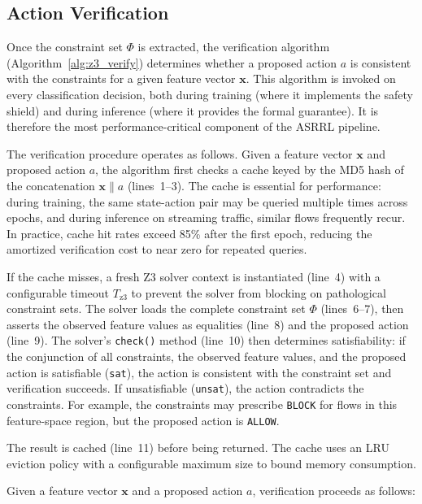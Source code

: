 \documentclass[12pt, letterpaper, oneside]{report}
\newcommand{\ASRRL}{\textsc{ASRRL}}
\newcommand{\bx}{\mathbf{x}}
\begin{document}
\subsection{Action Verification}
\label{sec:z3_verify}

Once the constraint set $\Phi$ is extracted, the verification algorithm (Algorithm~\ref{alg:z3_verify}) determines whether a proposed action $a$ is consistent with the constraints for a given feature vector $\bx$. This algorithm is invoked on every classification decision, both during training (where it implements the safety shield) and during inference (where it provides the formal guarantee). It is therefore the most performance-critical component of the \ASRRL{} pipeline.

The verification procedure operates as follows. Given a feature vector $\bx$ and proposed action $a$, the algorithm first checks a cache keyed by the MD5 hash of the concatenation $\bx \| a$ (lines~1--3). The cache is essential for performance: during training, the same state-action pair may be queried multiple times across epochs, and during inference on streaming traffic, similar flows frequently recur. In practice, cache hit rates exceed 85\% after the first epoch, reducing the amortized verification cost to near zero for repeated queries.

If the cache misses, a fresh Z3 solver context is instantiated (line~4) with a configurable timeout $T_{\text{z3}}$ to prevent the solver from blocking on pathological constraint sets. The solver loads the complete constraint set $\Phi$ (lines~6--7), then asserts the observed feature values as equalities (line~8) and the proposed action (line~9). The solver's \texttt{check()} method (line~10) then determines satisfiability: if the conjunction of all constraints, the observed feature values, and the proposed action is satisfiable (\texttt{sat}), the action is consistent with the constraint set and verification succeeds. If unsatisfiable (\texttt{unsat}), the action contradicts the constraints. For example, the constraints may prescribe \texttt{BLOCK} for flows in this feature-space region, but the proposed action is \texttt{ALLOW}.

The result is cached (line~11) before being returned. The cache uses an LRU eviction policy with a configurable maximum size to bound memory consumption.

Given a feature vector $\bx$ and a proposed action $a$, verification proceeds as follows:
\end{document}
